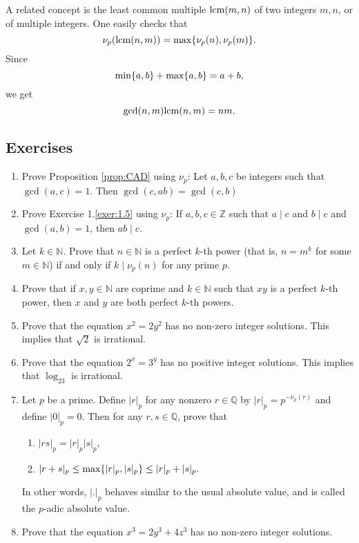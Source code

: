 \documentclass{article}
\def\Z{{\mathbb Z}}
\def\lcm{{\rm lcm}}
\def\min{{\rm min}}
\def\N{{\mathbb N}}
\def\Q{{\mathbb Q}}
\def\Z{{\mathbb Z}}
\def\Q{{\mathbb Q}}
\def\max{{\rm max}}
\begin{document}
A related concept is the least common multiple $\lcm(m,n)$ of two integers $m,n$, or of multiple integers. One easily checks that $$\nu_p(\lcm(n,m)) = \max\{\nu_p(n),\nu_p(m)\}.$$
Since $$\min\{a,b\} + \max\{a,b\} = a + b,$$
we get $$\gcd(n,m)\lcm(n,m) = nm.$$

\subsection*{Exercises}
\begin{enumerate}[\thesection .1]
        \item Prove Proposition \ref{prop:CAD} using $\nu_p$: Let $a,b,c$ be integers such that $\gcd(a,c) = 1$. Then $\gcd(c, ab) = \gcd(c, b)$
    \item Prove Exercise 1.\ref{exer:1.5} using $\nu_p$: If $a,b,c\in\Z$ such that $a\mid c$ and $b\mid c$ and $\gcd(a,b) = 1$, then $ab\mid c$.
    \item Let $k\in\N$. Prove that $n\in\N$ is a perfect $k$-th power (that is, $n = m^k$ for some $m\in\N$) if and only if $k\mid\nu_p(n)$ for any prime $p$.
    \item Prove that if $x,y\in\N$ are coprime and $k\in\N$ such that $xy$ is a perfect $k$-th power, then $x$ and $y$ are both perfect $k$-th powers.
    \item Prove that the equation $x^2 = 2y^2$ has no non-zero integer solutions. This implies that $\sqrt{2}$ is irrational.
    \item Prove that the equation $2^x = 3^y$ has no positive integer solutions. This implies that $\log_23$ is irrational.
    \item Let $p$ be a prime. Define $|r|_p$ for any nonzero $r\in\Q$ by $|r|_p = p^{-\nu_p(r)}$ and define $|0|_p = 0$. Then for any $r,s\in\Q$, prove that
    \begin{enumerate}
        \item $|rs|_p = |r|_p|s|_p$,
        \item $|r+s|_p \leq \max\{|r|_p,|s|_p\}\leq |r|_p + |s|_p.$
    \end{enumerate}
    In other words, $|.|_p$ behaves similar to the usual absolute value, and is called the $p$-adic absolute value.
    \item Prove that the equation $x^3 = 2y^3 + 4z^3$ has no non-zero integer solutions.
\end{enumerate}
\end{document}
